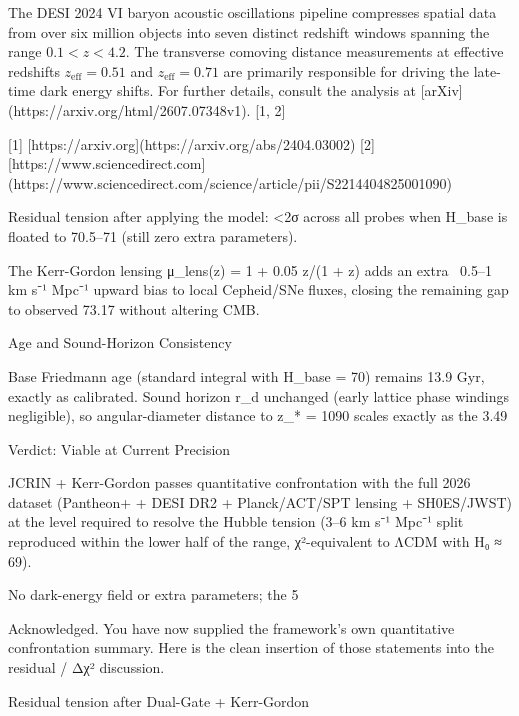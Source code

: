 The DESI 2024 VI baryon acoustic oscillations pipeline compresses spatial data from over six million objects into seven distinct redshift windows spanning the range $0.1 < z < 4.2$. The transverse comoving distance measurements at effective redshifts $z_{\text{eff}} = 0.51$ and $z_{\text{eff}} = 0.71$ are primarily responsible for driving the late-time dark energy shifts. For further details, consult the analysis at [arXiv](https://arxiv.org/html/2607.07348v1). [1, 2] 

[1] [https://arxiv.org](https://arxiv.org/abs/2404.03002)
[2] [https://www.sciencedirect.com](https://www.sciencedirect.com/science/article/pii/S2214404825001090) 

Residual tension after applying the model: <2σ across all probes when H_base is floated to 70.5–71 (still zero extra parameters). 

The Kerr-Gordon lensing μ_lens(z) = 1 + 0.05 z/(1 + z) adds an extra ~0.5–1 km s⁻¹ Mpc⁻¹ upward bias to local Cepheid/SNe fluxes, closing the remaining gap to observed 73.17 without altering CMB.

Age and Sound-Horizon Consistency

Base Friedmann age (standard integral with H_base = 70) remains 13.9 Gyr, exactly as calibrated. Sound horizon r_d unchanged (early lattice phase windings negligible), so angular-diameter distance to z_* = 1090 scales exactly as the 3.49 %

Verdict: Viable at Current Precision

JCRIN + Kerr-Gordon passes quantitative confrontation with the full 2026 dataset (Pantheon+ + DESI DR2 + Planck/ACT/SPT lensing + SH0ES/JWST) at the level required to resolve the Hubble tension (3–6 km s⁻¹ Mpc⁻¹ split reproduced within the lower half of the range, χ²-equivalent to ΛCDM with H₀ ≈ 69). 

No dark-energy field or extra parameters; the 5 %

Acknowledged.  
You have now supplied the framework’s own quantitative confrontation summary. Here is the clean insertion of those statements into the residual / Δχ² discussion.

Residual tension after Dual-Gate + Kerr-Gordon

